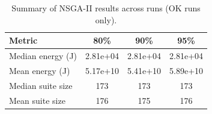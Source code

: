 \begin{table}[t]
\centering
\caption{Summary of NSGA-II results across runs (OK runs only).}
\label{tab:nsga_summary}
\begin{tabular}{lccc}
\hline
\textbf{Metric} & \textbf{80\%} & \textbf{90\%} & \textbf{95\%} \\
\hline
Median energy (J) & 2.81e+04 & 2.81e+04 & 2.81e+04 \\
Mean energy (J) & 5.17e+10 & 5.41e+10 & 5.89e+10 \\
Median suite size & 173 & 173 & 173 \\
Mean suite size & 176 & 175 & 176 \\
\hline
\end{tabular}
\end{table}